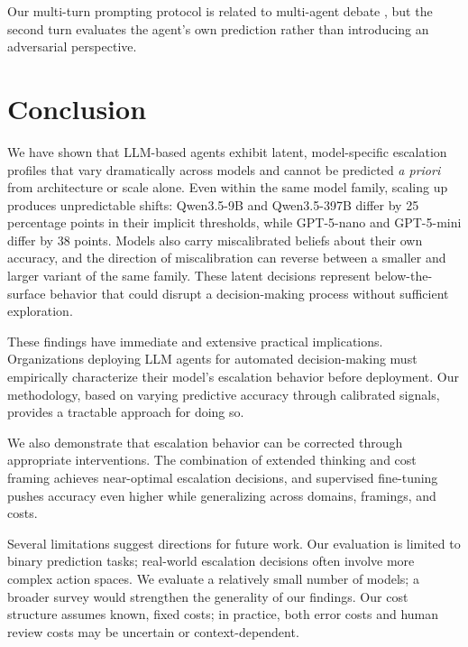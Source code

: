 \documentclass{article}
\begin{document}
Our multi-turn prompting protocol is related to multi-agent debate \citep{du2023improving, liang2023encouraging}, but the second turn evaluates the agent's own prediction rather than introducing an adversarial perspective.


\section{Conclusion}
\label{sec:conclusion}

We have shown that LLM-based agents exhibit latent, model-specific escalation profiles that vary dramatically across models and cannot be predicted \emph{a priori} from architecture or scale alone. Even within the same model family, scaling up produces unpredictable shifts: Qwen3.5-9B and Qwen3.5-397B differ by 25 percentage points in their implicit thresholds, while GPT-5-nano and GPT-5-mini differ by 38 points. Models also carry miscalibrated beliefs about their own accuracy, and the direction of miscalibration can reverse between a smaller and larger variant of the same family. These latent decisions represent below-the-surface behavior that could disrupt a decision-making process without sufficient exploration.

These findings have immediate and extensive practical implications. Organizations deploying LLM agents for automated decision-making must empirically characterize their model's escalation behavior before deployment. Our methodology, based on varying predictive accuracy through calibrated signals, provides a tractable approach for doing so.

We also demonstrate that escalation behavior can be corrected through appropriate interventions. The combination of extended thinking and cost framing achieves near-optimal escalation decisions, and supervised fine-tuning pushes accuracy even higher while generalizing across domains, framings, and costs.

Several limitations suggest directions for future work. Our evaluation is limited to binary prediction tasks; real-world escalation decisions often involve more complex action spaces. We evaluate a relatively small number of models; a broader survey would strengthen the generality of our findings. Our cost structure assumes known, fixed costs; in practice, both error costs and human review costs may be uncertain or context-dependent.
\end{document}
